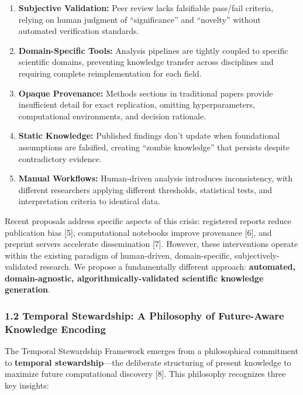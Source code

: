 \documentclass[
]{article}
\begin{document}
\begin{enumerate}
\def\labelenumi{\arabic{enumi}.}
\item
  \textbf{Subjective Validation:} Peer review lacks falsifiable
  pass/fail criteria, relying on human judgment of ``significance'' and
  ``novelty'' without automated verification standards.
\item
  \textbf{Domain-Specific Tools:} Analysis pipelines are tightly coupled
  to specific scientific domains, preventing knowledge transfer across
  disciplines and requiring complete reimplementation for each field.
\item
  \textbf{Opaque Provenance:} Methods sections in traditional papers
  provide insufficient detail for exact replication, omitting
  hyperparameters, computational environments, and decision rationale.
\item
  \textbf{Static Knowledge:} Published findings don't update when
  foundational assumptions are falsified, creating ``zombie knowledge''
  that persists despite contradictory evidence.
\item
  \textbf{Manual Workflows:} Human-driven analysis introduces
  inconsistency, with different researchers applying different
  thresholds, statistical tests, and interpretation criteria to
  identical data.
\end{enumerate}

Recent proposals address specific aspects of this crisis: registered
reports reduce publication bias {[}5{]}, computational notebooks improve
provenance {[}6{]}, and preprint servers accelerate dissemination
{[}7{]}. However, these interventions operate within the existing
paradigm of human-driven, domain-specific, subjectively-validated
research. We propose a fundamentally different approach:
\textbf{automated, domain-agnostic, algorithmically-validated scientific
knowledge generation}.

\subsubsection{1.2 Temporal Stewardship: A Philosophy of Future-Aware
Knowledge
Encoding}\label{temporal-stewardship-a-philosophy-of-future-aware-knowledge-encoding}

The Temporal Stewardship Framework emerges from a philosophical
commitment to \textbf{temporal stewardship}---the deliberate structuring
of present knowledge to maximize future computational discovery {[}8{]}.
This philosophy recognizes three key insights:
\end{document}
